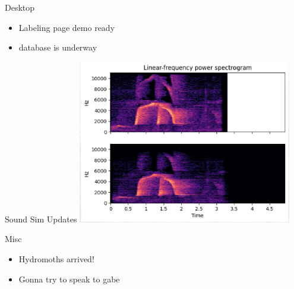 \begin{frame}{Desktop}
    \begin{itemize}
        \item Labeling page demo ready
        \item database is underway
    \end{itemize}    
\end{frame}

\begin{frame}{Sound Sim Updates}
    \centering
    \includegraphics[height=0.7\textheight,width=0.7\textwidth,keepaspectratio]{images/soundsim_demo.png}
\end{frame}

\begin{frame}{Misc}
    \begin{itemize}
        \item Hydromoths arrived!
        \item Gonna try to speak to gabe
    \end{itemize}    
\end{frame}




